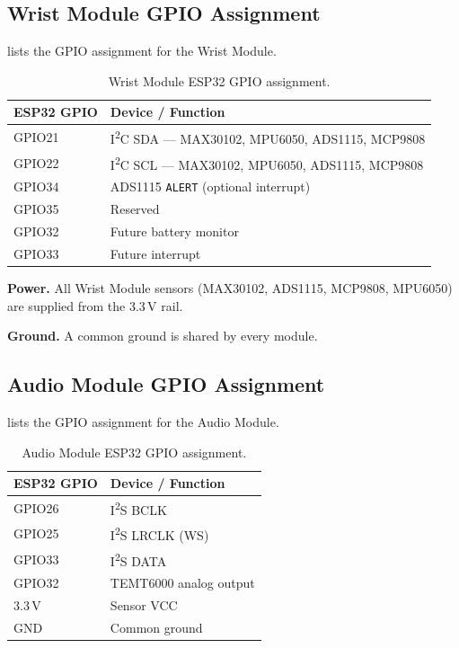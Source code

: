 \subsection{Wrist Module GPIO Assignment}
\label{sec:wrist-gpio-assignment}

 lists the GPIO assignment for the Wrist Module.

\begin{table}[H]
\centering
\caption{Wrist Module ESP32 GPIO assignment.}
\label{tab:wrist-gpio}
\small
\begin{tabularx}{\columnwidth}{@{}l Y@{}}
\toprule
\textbf{ESP32 GPIO} & \textbf{Device / Function} \\
\midrule
GPIO21 & I\textsuperscript{2}C SDA --- MAX30102, MPU6050, ADS1115, MCP9808 \\
GPIO22 & I\textsuperscript{2}C SCL --- MAX30102, MPU6050, ADS1115, MCP9808 \\
GPIO34 & ADS1115 \texttt{ALERT} (optional interrupt) \\
GPIO35 & Reserved \\
GPIO32 & Future battery monitor \\
GPIO33 & Future interrupt \\
\bottomrule
\end{tabularx}
\end{table}

\textbf{Power.} All Wrist Module sensors (MAX30102, ADS1115, MCP9808, MPU6050) are supplied from the 3.3\,V rail.

\textbf{Ground.} A common ground is shared by every module.

\subsection{Audio Module GPIO Assignment}
\label{sec:audio-gpio-assignment}

 lists the GPIO assignment for the Audio Module.

\begin{table}[H]
\centering
\caption{Audio Module ESP32 GPIO assignment.}
\label{tab:audio-gpio}
\small
\begin{tabularx}{\columnwidth}{@{}l Y@{}}
\toprule
\textbf{ESP32 GPIO} & \textbf{Device / Function} \\
\midrule
GPIO26 & I\textsuperscript{2}S BCLK \\
GPIO25 & I\textsuperscript{2}S LRCLK (WS) \\
GPIO33 & I\textsuperscript{2}S DATA \\
GPIO32 & TEMT6000 analog output \\
3.3\,V & Sensor VCC \\
GND & Common ground \\
\bottomrule
\end{tabularx}
\end{table}

